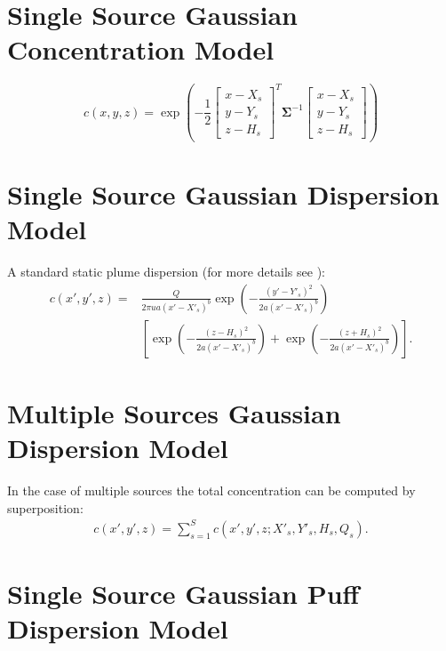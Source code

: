 \documentclass[a4paper,11pt]{report}
\begin{document}
\section{Single Source Gaussian Concentration Model}
\begin{equation}\label{eqn:singlesourcegaussian}
c(x,y,z) = %
\exp\left(-\frac{1}{2}
\left[\begin{array}{c}
x-X_s\\
y-Y_s\\
z-H_s
\end{array} \right]^T{\boldsymbol\Sigma}^{-1}
\left[\begin{array}{c}
x-X_s\\
y-Y_s\\
z-H_s
\end{array} \right]
\right)
\end{equation}

\section{Single Source Gaussian Dispersion Model}

A standard static plume dispersion (for more details see \cite{stockie2011}):
\begin{align}\label{eqn:singlesourcegaussiandispersion}
c(x',y',z) = &\frac{Q}{2\pi u a (x'-X'_s)^b}  \exp \left(-\frac{(y'-Y'_s)^2}{2 a (x'-X'_s)^b}\right) \nonumber \\
  & \left[ \exp \left(-\frac{(z-H_s)^2}{2 a (x'-X'_s)^b}\right) + \exp \left(-\frac{(z+H_s)^2}{2 a (x'-X'_s)^b}\right)\right].
\end{align}


\section{Multiple Sources Gaussian Dispersion Model}

In the case of multiple sources the total concentration can be computed by superposition:
\begin{align}\label{eqn:multiplesourcesgaussiandispersion}
c(x',y',z) = \sum_{s=1}^S c(x',y',z;X'_s,Y'_s,H_s,Q_s).
\end{align}

\section{Single Source Gaussian Puff Dispersion Model}
\end{document}
